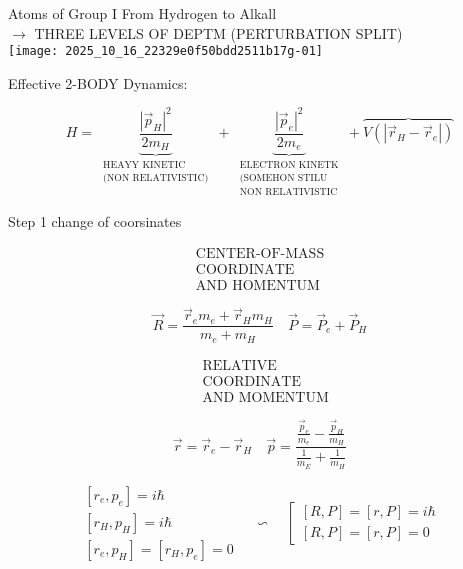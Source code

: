 
\captionsetup{singlelinecheck=false}
Atoms of Group I From Hydrogen to Alkall\\
$\rightarrow$ THREE LEVELS OF DEPTM (PERTURBATION SPLIT)\\
\texttt{[image: 2025\_10\_16\_22329e0f50bdd2511b17g-01]}

Effective 2-BODY Dynamics:

$$
H=\underbrace{\frac{\left|\vec{p}_{H}\right|^{2}}{2 m_{H}}}_{\substack{\text { HEAYY KINETIC } \\ \text { (NON RELATIVISTIC) }}}+\underbrace{\frac{\left|\vec{p}_{e}\right|^{2}}{2 m_{e}}}_{\substack{\text { ELECTRON KINETK } \\ \text { (SOMEHON STILU } \\ \text { NON RELATIVISTIC }}}+\overbrace{V\left(\left|\vec{r}_{H}-\vec{r}_{e}\right|\right)}
$$

Step 1 change of coorsinates

$$
\begin{gathered}
\text { CENTER-OF-MASS } \\
\text { COORDINATE } \\
\text { AND HOMENTUM }
\end{gathered}
$$

$$
\vec{R}=\frac{\vec{r}_{e} m_{e}+\vec{r}_{H} m_{H}}{m_{e}+m_{H}} \quad \vec{P}=\vec{P}_{e}+\vec{P}_{H}
$$

$$
\begin{aligned}
& \text { RELATIVE } \\
& \text { COORDINATE } \\
& \text { AND MOMENTUM }
\end{aligned}
$$

$$
\vec{r}=\vec{r}_{e}-\vec{r}_{H} \quad \vec{p}=\frac{\frac{\vec{p}_{e}}{m_{e}}-\frac{\vec{p}_{H}}{m_{H}}}{\frac{1}{m_{E}}+\frac{1}{m_{H}}}
$$

$$
\begin{gathered}
{\left[r_{e}, p_{e}\right]=i \hbar} \\
{\left[r_{H}, p_{H}\right]=i \hbar} \\
{\left[r_{e}, p_{H}\right]=\left[r_{H}, p_{e}\right]=0}
\end{gathered} \quad \backsim \quad\left[\begin{array}{l}
{[R, P]=[r, P]=i \hbar} \\
{[R, P]=[r, P]=0}
\end{array}\right.
$$

